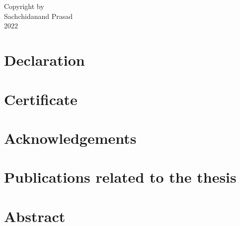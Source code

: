 \documentclass[12pt, twoside]{book}
\begin{document}
	\frontmatter
	
	
	\chapter*{}
	\vspace{4.0in}
	\begin{center}
		Copyright by \\[.2cm]
		Sachchidanand Prasad \\[0.2cm]
		2022
	\end{center}
	
	\chapter*{Declaration}
	

	\chapter*{Certificate}
	

	\chapter{Acknowledgements}
	

	\chapter*{}
	

	\chapter*{Publications related to the thesis}
	

	\chapter{Abstract}
	


	\dominitoc
	\tableofcontents

	\listoffigures
	
\end{document}
